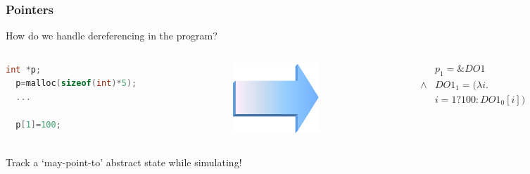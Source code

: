 
\begin{frame}[fragile]
\frametitle{Pointers}

How do we handle dereferencing in the program?
\pause\vfill

\begin{columns}
\begin{column}{.4\textwidth}
\begin{lstlisting}[language=C,basicstyle=\rmfamily,escapechar=\$,columns=flexible]
  int *p;
  p=malloc(sizeof(int)*5);
  ...

  p[1]=100;
\end{lstlisting}
\end{column}
\begin{column}{.1\textwidth}
\includegraphics[width=\textwidth]{arrow}
\end{column}
\begin{column}{.5\textwidth}
$\begin{array}{ll}
      & p_1=\&\mathit{DO1} \\
\land & \mathit{DO1}_1 = (\lambda i. \\
      &i=1?100: \mathit{DO1}_0[i])
\end{array}$
\end{column}
\end{columns}
\vfill

Track a `may-point-to' abstract state while simulating!

\end{frame}

